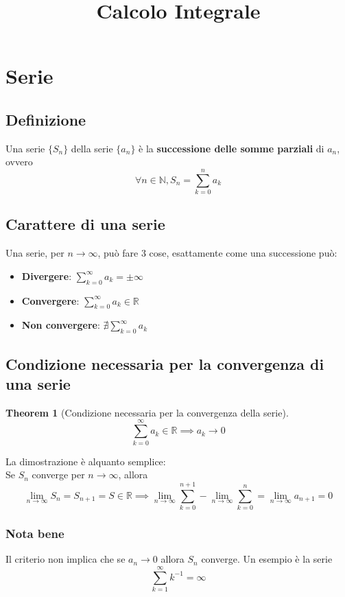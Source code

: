\documentclass{article}
\newtheorem{theorem}{Theorem}[section]
\begin{document}
\title{Calcolo Integrale}
\maketitle
\section{Serie}
    \subsection{Definizione}
        Una serie $\{S_n\}$ della serie $\{a_n\}$ è la \textbf{successione delle somme parziali} 
        di $a_n$, ovvero 
        $$\forall n \in \mathbb{N}, S_n = \sum_{k=0}^n a_k$$
    \subsection{Carattere di una serie}
        Una serie, per $n \to \infty$, può fare 3 cose, esattamente come una successione può:
        \begin{itemize}
            \item \textbf{Divergere}: $\sum_{k=0}^\infty a_k = \pm \infty$
            \item \textbf{Convergere}: $\sum_{k=0}^\infty a_k \in \mathbb{R}$
            \item \textbf{Non convergere}: $\nexists \sum_{k=0}^\infty a_k$
        \end{itemize}
    \subsection{Condizione necessaria per la convergenza di una serie}
        \begin{theorem}[Condizione necessaria per la convergenza della serie]
            $$\sum_{k=0}^\infty a_k \in \mathbb{R} \implies a_k \to 0$$
        \end{theorem}
        La dimostrazione è alquanto semplice: \\
        Se $S_n$ converge per $n \to \infty$, allora 
        $$\lim_{n \to \infty} S_n = S_{n+1} = S \in \mathbb{R} \implies 
            \lim_{n \to \infty} \sum_{k=0}^{n+1} - \lim_{n \to \infty} \sum_{k=0}^{n} = 
            \lim_{n \to \infty} a_{n+1} = 0
        $$
        \subsubsection{Nota bene}
            Il criterio non implica che se $a_n \to 0$ allora $S_n$ converge. Un esempio è la serie 
            $$\sum_{k=1}^\infty k^{-1} = \infty$$
\end{document}
